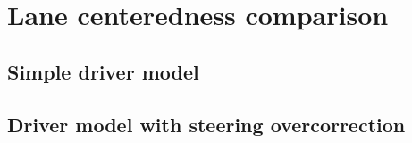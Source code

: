 \chapter{Lane centeredness comparison}

\section{Simple driver model}
\label{sec:lane-center-app-1}


\newpage
\section{Driver model with steering overcorrection}
\label{sec:lane-center-app-2}
